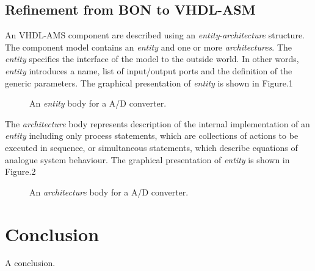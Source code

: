 \documentclass{article}
\newcommand{\ent}{\emph{entity}\xspace}
\newcommand{\arch}{\emph{architecture}\xspace}
\newcommand{\archs}{\emph{architectures}\xspace}
\begin{document}
\subsection{Refinement from BON to VHDL-ASM}

An VHDL-AMS component are described using an \ent-\arch structure. 
The component model contains an \ent and one or more \archs. 
The \ent specifies the interface of the model to the outside world. 
In other words, \ent introduces a name, list of input/output ports 
and the definition of the generic parameters. The graphical 
presentation of \ent is shown in Figure.1 

\begin{figure}[htp]
\centering

\caption{An \ent body for a A/D converter.}
\label{figure:adc-entity}
\end{figure}

The \arch body represents description of the internal implementation 
of an \ent including only process statements, which are collections 
of actions to be executed in sequence, or simultaneous statements, 
which describe equations of analogue system behaviour. 
The graphical presentation of \ent is shown in Figure.2
\begin{figure}[htp]
\centering

\caption{An \arch body for a A/D converter.}
\label{figure:adc-entity}
\end{figure} 



\section{Conclusion}

A conclusion.




\end{document}
